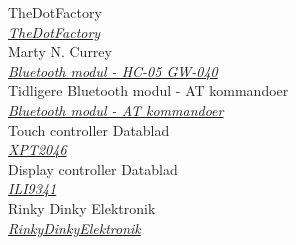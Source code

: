\documentclass[12pt]{article}
\renewcommand{\refname}{whatever}
\begin{document}
\renewcommand\refname{References}
\begin{thebibliography}{9}
	 TheDotFactory \\
	\textit{\href{http://www.eran.io/the-dot-factory-an-lcd-font-and-image-generator/}{TheDotFactory}}\\ 
	
	Marty N. Currey \\
	\textit{\href{http://www.martyncurrey.com/arduino-with-hc-05-bluetooth-module-at-mode}{Bluetooth modul - HC-05 GW-040}
	}	\\

	Tidligere Bluetooth modul - AT kommandoer \\
	\textit{\href{http://store.iteadstudio.com/images/produce/Shield/BTshieldv2.2/BTShieldV2.2_DS.pdf}{Bluetooth modul - AT kommandoer}
	}	\\
	
	Touch controller Datablad \\
	\textit{\href{https://www.buydisplay.com/download/ic/XPT2046.pdf}{XPT2046}
	}\\
	
	Display controller Datablad \\
	\textit{\href{https://cdn-shop.adafruit.com/datasheets/ILI9341.pdf}{ILI9341}
	}	\\
	Rinky Dinky Elektronik \\
	\textit{\href{http://www.rinkydinkelectronics.com/library.php}{RinkyDinkyElektronik}
	}	\\

	
\end{thebibliography}
\end{document}
